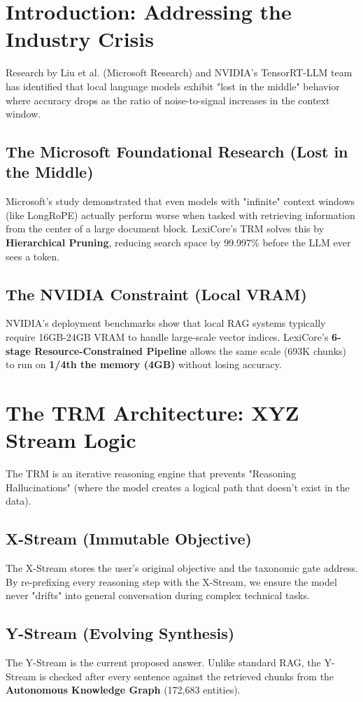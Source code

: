 \documentclass[11pt]{article}
\begin{document}
\section{Introduction: Addressing the Industry Crisis}
Research by Liu et al. (Microsoft Research) and NVIDIA's TensorRT-LLM team has identified that local language models exhibit "lost in the middle" behavior where accuracy drops as the ratio of noise-to-signal increases in the context window. 

\subsection{The Microsoft Foundational Research (Lost in the Middle)}
Microsoft's study demonstrated that even models with "infinite" context windows (like LongRoPE) actually perform worse when tasked with retrieving information from the center of a large document block. LexiCore's TRM solves this by \textbf{Hierarchical Pruning}, reducing search space by 99.997\% before the LLM ever sees a token.

\subsection{The NVIDIA Constraint (Local VRAM)}
NVIDIA's deployment benchmarks show that local RAG systems typically require 16GB-24GB VRAM to handle large-scale vector indices. LexiCore's \textbf{6-stage Resource-Constrained Pipeline} allows the same scale (693K chunks) to run on \textbf{1/4th the memory (4GB)} without losing accuracy.

\section{The TRM Architecture: XYZ Stream Logic}
The TRM is an iterative reasoning engine that prevents "Reasoning Hallucinations" (where the model creates a logical path that doesn't exist in the data).

\subsection{X-Stream (Immutable Objective)}
The X-Stream stores the user's original objective and the taxonomic gate address. By re-prefixing every reasoning step with the X-Stream, we ensure the model never "drifts" into general conversation during complex technical tasks.

\subsection{Y-Stream (Evolving Synthesis)}
The Y-Stream is the current proposed answer. Unlike standard RAG, the Y-Stream is checked after every sentence against the retrieved chunks from the \textbf{Autonomous Knowledge Graph} (172,683 entities).
\end{document}
